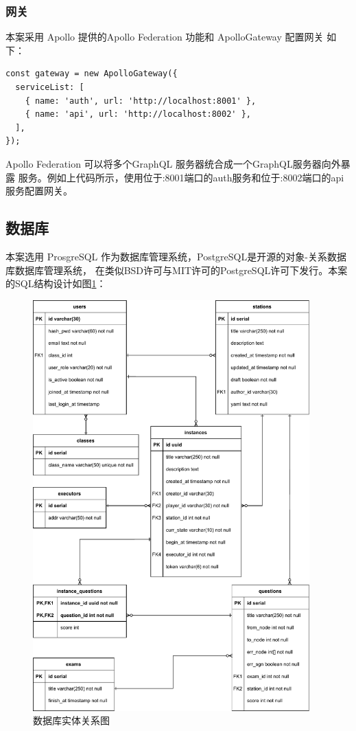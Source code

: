 \subsubsection{网关}
本案采用 Apollo 提供的Apollo Federation 功能和 ApolloGateway 配置网关
如下：

\begin{lstlisting}
const gateway = new ApolloGateway({
  serviceList: [
    { name: 'auth', url: 'http://localhost:8001' },
    { name: 'api', url: 'http://localhost:8002' },
  ],
});
\end{lstlisting}

Apollo Federation 可以将多个GraphQL 服务器统合成一个GraphQL服务器向外暴露
服务。例如上代码所示，使用位于:8001端口的auth服务和位于:8002端口的api服务配置网关。



\subsection{数据库}
本案选用 ProsgreSQL 作为数据库管理系统，PostgreSQL是开源的对象-关系数据库数据库管理系统，
在类似BSD许可与MIT许可的PostgreSQL许可下发行。本案的SQL结构设计如图\ref{erd}：

\begin{figure}[htbp!]
    \centering
    \includegraphics[width=0.95\textwidth]{figures/pdf/erd.pdf}
    \caption{\label{erd}数据库实体关系图}
\end{figure}

